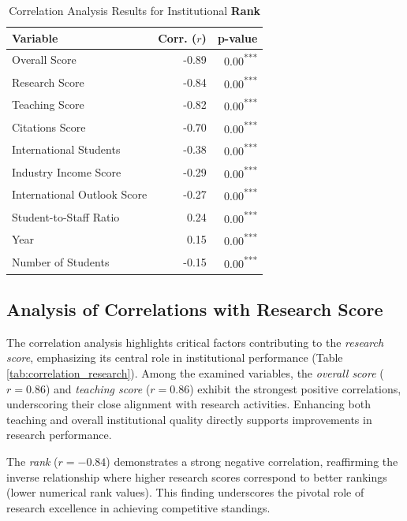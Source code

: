 \documentclass[sigconf]{acmart}
\begin{document}
\begin{table}[h!]
	\centering
	\caption{Correlation Analysis Results for Institutional \textbf{Rank}}
	\label{tab:correlation_rank}
	\begin{tabular}{|l|r|r|}
		\hline
		\textbf{Variable} & \textbf{Corr. ($r$)} & \textbf{p-value} \\
		\hline
		Overall Score & -0.89 & 0.00\textsuperscript{***} \\
		Research Score & -0.84 & 0.00\textsuperscript{***} \\
		Teaching Score & -0.82 & 0.00\textsuperscript{***} \\
		Citations Score & -0.70 & 0.00\textsuperscript{***} \\
		International Students & -0.38 & 0.00\textsuperscript{***} \\
		Industry Income Score & -0.29 & 0.00\textsuperscript{***} \\
		International Outlook Score & -0.27 & 0.00\textsuperscript{***} \\
		Student-to-Staff Ratio & 0.24 & 0.00\textsuperscript{***} \\
		Year & 0.15 & 0.00\textsuperscript{***} \\
		Number of Students & -0.15 & 0.00\textsuperscript{***} \\
		\hline
	\end{tabular}
\end{table}


\subsection{Analysis of Correlations with Research Score}

The correlation analysis highlights critical factors contributing to the \textit{research score}, emphasizing its central role in institutional performance (Table \ref{tab:correlation_research}). Among the examined variables, the \textit{overall score} ($r = 0.86$) and \textit{teaching score} ($r = 0.86$) exhibit the strongest positive correlations, underscoring their close alignment with research activities. Enhancing both teaching and overall institutional quality directly supports improvements in research performance.

The \textit{rank} ($r = -0.84$) demonstrates a strong negative correlation, reaffirming the inverse relationship where higher research scores correspond to better rankings (lower numerical rank values). This finding underscores the pivotal role of research excellence in achieving competitive standings.
\end{document}
